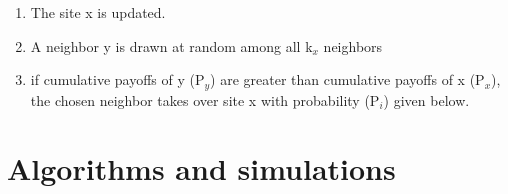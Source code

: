 \documentclass[english, twoside, 12pt, a4paper]{article}
\theoremstyle{definition}
\theoremstyle{plain}
\theoremstyle{remark}
\begin{document}
%
%
%
%
%
%

\begin{enumerate}
  \item The site x is updated.
  \item A neighbor y is drawn at random among all k$_{x}$ neighbors
  \item if cumulative payoffs of y (P$_{y}$) are greater than cumulative payoffs of x (P$_{x}$), the chosen neighbor takes over site x with probability (P$_{i}$) given below.
\end{enumerate}

\clearpage
\section{Algorithms and simulations}
\end{document}
